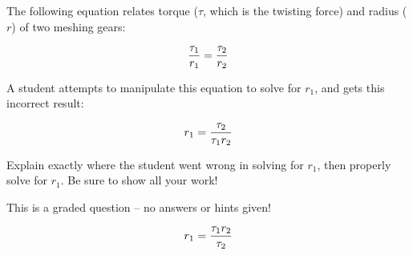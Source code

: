 

The following equation relates torque ($\tau$, which is the twisting force) and radius ($r$) of two meshing gears:

$${\tau_1 \over r_1} = {\tau_2 \over r_2}$$

A student attempts to manipulate this equation to solve for $r_1$, and gets this incorrect result:

$$r_1 = {\tau_2 \over {\tau_1 r_2}}$$

Explain exactly where the student went wrong in solving for $r_1$, then properly solve for $r_1$.  Be sure to show all your work!

\vfil 

\eject






This is a graded question -- no answers or hints given!
 






$$r_1 = {{\tau_1 r_2} \over \tau_2}$$




